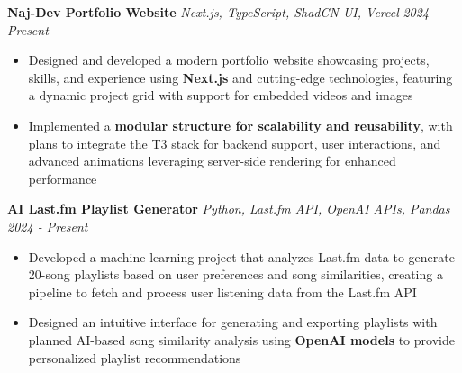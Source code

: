 \documentclass[letterpaper]{article}
\newenvironment{tightitemize}{%
  \begin{itemize}\small\setlength{\baselineskip}{0.95\baselineskip}\itemsep -1mm%
}{\end{itemize}}
\begin{document}
    \vspace{-2mm}
    {\textbf{Naj-Dev Portfolio Website}} {\sl Next.js, TypeScript, ShadCN UI, Vercel} \hfill \textsl{2024 - Present}\\
    \vspace{-2mm}
    \begin{tightitemize} \itemsep -1mm
    
        \item Designed and developed a modern portfolio website showcasing projects, skills, and experience using \textbf{Next.js} and cutting-edge technologies, featuring a dynamic project grid with support for embedded videos and images

        \item Implemented a \textbf{modular structure for scalability and reusability}, with plans to integrate the T3 stack for backend support, user interactions, and advanced animations leveraging server-side rendering for enhanced performance

    \end{tightitemize}
    \vspace{-2mm}

    {\textbf{AI Last.fm Playlist Generator}} {\sl Python, Last.fm API, OpenAI APIs, Pandas} \hfill \textsl{2024 - Present}\\
    \vspace{-2mm}
    \begin{tightitemize} \itemsep -1mm
    
        \item Developed a machine learning project that analyzes Last.fm data to generate 20-song playlists based on user preferences and song similarities, creating a pipeline to fetch and process user listening data from the Last.fm API

        \item Designed an intuitive interface for generating and exporting playlists with planned AI-based song similarity analysis using \textbf{OpenAI models} to provide personalized playlist recommendations

    \end{tightitemize}
    \vspace{-2mm}
\end{document}
